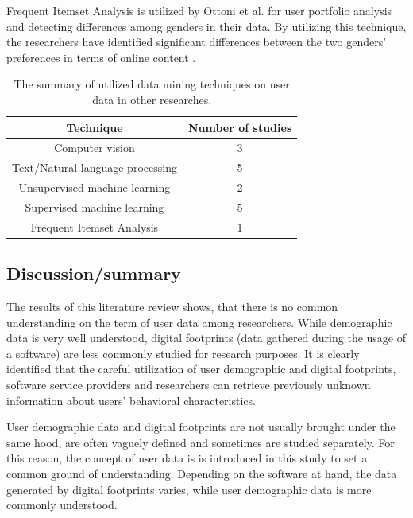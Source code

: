   Frequent Itemset Analysis is utilized by Ottoni et al. \cite{ottoni2013ladies} for user portfolio analysis and detecting differences among genders in their data. By utilizing this technique, the researchers have identified significant differences between the two genders' preferences in terms of online content \cite{ottoni2013ladies}. 

  \begin{table}[!t]
    \renewcommand{\arraystretch}{1.5}
    \caption{The summary of utilized data mining techniques on user data in other researches.}
    \label{table_of_techniques}
    \centering
      \begin{tabular}{c||c}
        Technique & Number of studies \\ 
        \hline
        Computer vision & 3  \\
        Text/Natural language processing & 5 \\
        Unsupervised machine learning & 2 \\
        Supervised machine learning & 5 \\
        Frequent Itemset Analysis & 1
      \end{tabular}
  \end{table}

\subsection{Discussion/summary}
The results of this literature review shows, that there is no common understanding on the term of user data among researchers. While demographic data is very well understood, digital footprints (data gathered during the usage of a software) are less commonly studied for research purposes. It is clearly identified that the careful utilization of user demographic and digital footprints, software service providers and researchers can retrieve previously unknown information about users' behavioral characteristics. 

User demographic data and digital footprints are not usually brought under the same hood, are often vaguely defined and sometimes are studied separately. For this reason, the concept of user data is is introduced in this study to set a common ground of understanding. Depending on the software at hand, the data generated by digital footprints varies, while user demographic data is more commonly understood. 

